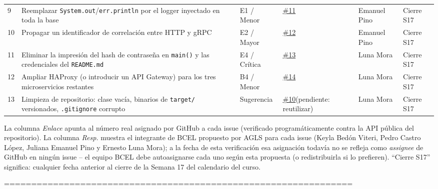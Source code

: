 \documentclass[11pt,a4paper]{article}
\begin{document}
{\begin{xltabular}{\textwidth}{@{}p{0.5cm}Xp{1.9cm}p{1.7cm}p{1.7cm}p{1.9cm}@{}}
9 & Reemplazar \texttt{System.out}/\texttt{err.println} por el logger inyectado en toda la base & E1 / Menor & \raggedright\scriptsize\href{https://github.com/LEO23as/sga-sistema-distribuido/issues/11}{\#11} & \scriptsize Emanuel Pino & \scriptsize Cierre S17 \\
10 & Propagar un identificador de correlaci\'on entre HTTP y gRPC & E2 / Mayor & \raggedright\scriptsize\href{https://github.com/LEO23as/sga-sistema-distribuido/issues/12}{\#12} & \scriptsize Emanuel Pino & \scriptsize Cierre S17 \\
11 & Eliminar la impresi\'on del hash de contrase\~na en \texttt{main()} y las credenciales del \texttt{README.md} & E4 / Cr\'itica & \raggedright\scriptsize\href{https://github.com/LEO23as/sga-sistema-distribuido/issues/13}{\#13} & \scriptsize Luna Mora & \scriptsize Cierre S17 \\
12 & Ampliar HAProxy (o introducir un API Gateway) para los tres microservicios restantes & B4 / Menor & \raggedright\scriptsize\href{https://github.com/LEO23as/sga-sistema-distribuido/issues/14}{\#14} & \scriptsize Luna Mora & \scriptsize Cierre S17 \\
13 & Limpieza de repositorio: clase vac\'ia, binarios de \texttt{target/} versionados, \texttt{.gitignore} corrupto & Sugerencia & \raggedright\scriptsize\href{https://github.com/LEO23as/sga-sistema-distribuido/issues/10}{\#10}\newline (pendiente: reutilizar) & \scriptsize Luna Mora & \scriptsize Cierre S17 \\
\bottomrule
\end{xltabular}
}

\begin{notebox}[title=Referencia de columnas truncadas]
La columna \emph{Enlace} apunta al n\'umero real asignado por GitHub a cada issue (verificado program\'aticamente contra la API p\'ublica del repositorio). La columna \emph{Resp.} muestra el integrante de BCEL propuesto por AGLS para cada issue (Keyla Bed\'on Viteri, Pedro Castro L\'opez, Juliana Emanuel Pino y Ernesto Luna Mora); a la fecha de esta verificaci\'on esa asignaci\'on todav\'ia no se refleja como \emph{assignee} de GitHub en ning\'un issue -- el equipo BCEL debe autoasignarse cada uno seg\'un esta propuesta (o redistribuirla si lo prefieren). ``Cierre S17'' significa: cualquier fecha anterior al cierre de la Semana 17 del calendario del curso.
\end{notebox}

%
    ================================================================
\end{document}
